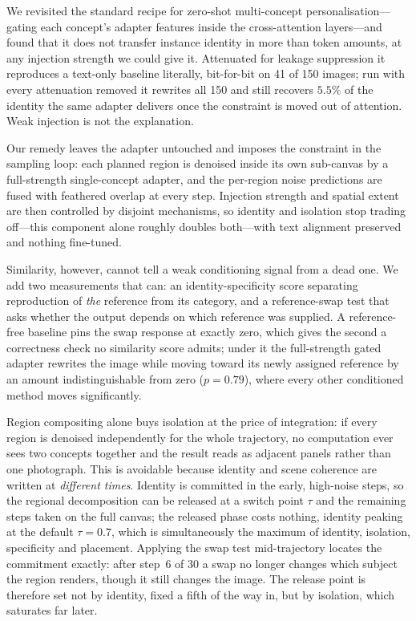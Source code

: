 \documentclass[review,10pt,times]{elsarticle}
\begin{document}
We revisited the standard recipe for zero-shot multi-concept
personalisation---gating each concept's adapter features inside the
cross-attention layers---and found that it does not transfer instance identity
in more than token amounts, at any injection strength we could give it.
Attenuated for leakage suppression it reproduces a text-only baseline
literally, bit-for-bit on 41 of 150 images; run with every attenuation removed
it rewrites all 150 and still recovers $5.5\%$ of the identity the same
adapter delivers once the constraint is moved out of attention.  Weak
injection is not the explanation.

Our remedy leaves the adapter untouched and imposes the constraint in the
sampling loop: each planned region is denoised inside its own sub-canvas by a
full-strength single-concept adapter, and the per-region noise predictions are
fused with feathered overlap at every step.  Injection strength and spatial
extent are then controlled by disjoint mechanisms, so identity and isolation
stop trading off---this component alone roughly doubles both---with text
alignment preserved and nothing fine-tuned.

Similarity, however, cannot tell a weak conditioning signal from a dead one.
We add two measurements that can: an identity-specificity score separating
reproduction of \emph{the} reference from its category, and a reference-swap
test that asks whether the output depends on which reference was supplied.  A
reference-free baseline pins the swap response at exactly zero, which gives
the second a correctness check no similarity score admits; under it the
full-strength gated adapter rewrites the image while moving toward its newly
assigned reference by an amount indistinguishable from zero ($p{=}0.79$),
where every other conditioned method moves significantly.

Region compositing alone buys isolation at the price of integration: if
every region is denoised independently for the whole trajectory, no
computation ever sees two concepts together and the result reads as adjacent
panels rather than one photograph.  This is avoidable because identity and
scene coherence are written at \emph{different times}.  Identity is committed
in the early, high-noise steps, so the regional decomposition can be released
at a switch point $\tau$ and the remaining steps taken on the full canvas; the
released phase costs nothing, identity peaking at the default $\tau{=}0.7$,
which is simultaneously the maximum of identity, isolation, specificity and
placement.  Applying the swap test mid-trajectory locates the commitment
exactly: after step~6 of 30 a swap no longer changes which subject the region
renders, though it still changes the image.  The release point is therefore
set not by identity, fixed a fifth of the way in, but by isolation, which
saturates far later.
\end{document}
